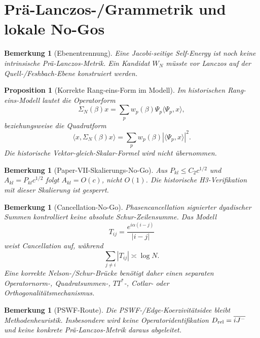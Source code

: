 \documentclass[11pt,a4paper]{amsart}
\newtheorem{proposition}[theorem]{Proposition}
\newtheorem{remark}[theorem]{Bemerkung}
\begin{document}
\section{Prä-Lanczos-/Grammetrik und lokale No-Gos}

\begin{remark}[Ebenentrennung]\label{rem:levels}
Eine Jacobi-seitige Self-Energy ist noch keine intrinsische
Prä-Lanczos-Metrik. Ein Kandidat $W_N$ müsste vor Lanczos auf der
Quell-/Feshbach-Ebene konstruiert werden.
\end{remark}

\begin{proposition}[Korrekte Rang-eins-Form im Modell]\label{prop:rank-one-form}
Im historischen Rang-eins-Modell lautet die Operatorform
\[
  \Sigma_N(\beta)x
  =\sum_p w_p(\beta)\Psi_p\langle\Psi_p,x\rangle,
\]
beziehungsweise die Quadratform
\[
  \langle x,\Sigma_N(\beta)x\rangle
  =\sum_p w_p(\beta)|\langle\Psi_p,x\rangle|^2.
\]
Die historische Vektor-gleich-Skalar-Formel wird nicht übernommen.
\end{proposition}

\begin{remark}[Paper-VII-Skalierungs-No-Go]\label{rem:h3-nogo}
Aus $P_{kl}\le C_2c^{1/2}$ und $A_{kl}=P_{kl}c^{1/2}$ folgt
$A_{kl}=O(c)$, nicht $O(1)$. Die historische H3-Verifikation mit dieser
Skalierung ist gesperrt.
\end{remark}

\begin{remark}[Cancellation-No-Go]\label{rem:cancellation-nogo}
Phasencancellation signierter dyadischer Summen kontrolliert keine absolute
Schur-Zeilensumme. Das Modell
\[
  T_{ij}=\frac{e^{i\alpha(i-j)}}{|i-j|}
\]
weist Cancellation auf, während
\[
  \sum_{j\ne i}|T_{ij}|\asymp\log N.
\]
Eine korrekte Nelson-/Schur-Brücke benötigt daher einen separaten
Operatornorm-, Quadratsummen-, $TT^*$-, Cotlar- oder Orthogonalitätsmechanismus.
\end{remark}

\begin{remark}[PSWF-Route]\label{rem:pswf}
Die PSWF-/Edge-Koerzivitätsidee bleibt Methodenheuristik. Insbesondere wird
keine Operatoridentifikation $D_{\rm rel}=\overline{iJ^-}$ und keine konkrete
Prä-Lanczos-Metrik daraus abgeleitet.
\end{remark}

\end{document}
